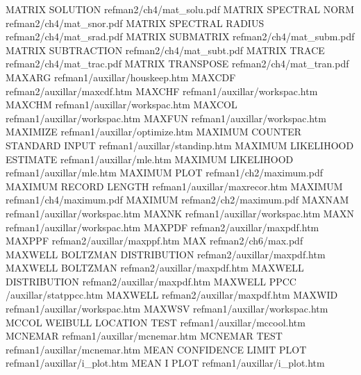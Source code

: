 MATRIX SOLUTION                         refman2/ch4/mat_solu.pdf
MATRIX SPECTRAL NORM                    refman2/ch4/mat_snor.pdf
MATRIX SPECTRAL RADIUS                  refman2/ch4/mat_srad.pdf
MATRIX SUBMATRIX                        refman2/ch4/mat_subm.pdf
MATRIX SUBTRACTION                      refman2/ch4/mat_subt.pdf
MATRIX TRACE                            refman2/ch4/mat_trac.pdf
MATRIX TRANSPOSE                        refman2/ch4/mat_tran.pdf
MAXARG                                  refman1/auxillar/houskeep.htm
MAXCDF                                  refman2/auxillar/maxcdf.htm
MAXCHF                                  refman1/auxillar/workspac.htm
MAXCHM                                  refman1/auxillar/workspac.htm
MAXCOL                                  refman1/auxillar/workspac.htm
MAXFUN                                  refman1/auxillar/workspac.htm
MAXIMIZE                                refman1/auxillar/optimize.htm
MAXIMUM COUNTER STANDARD INPUT          refman1/auxillar/standinp.htm
MAXIMUM LIKELIHOOD ESTIMATE             refman1/auxillar/mle.htm
MAXIMUM LIKELIHOOD                      refman1/auxillar/mle.htm
MAXIMUM PLOT                            refman1/ch2/maximum.pdf
MAXIMUM RECORD LENGTH                   refman1/auxillar/maxrecor.htm
MAXIMUM                                 refman1/ch4/maximum.pdf
MAXIMUM                                 refman2/ch2/maximum.pdf
MAXNAM                                  refman1/auxillar/workspac.htm
MAXNK                                   refman1/auxillar/workspac.htm
MAXN                                    refman1/auxillar/workspac.htm
MAXPDF                                  refman2/auxillar/maxpdf.htm
MAXPPF                                  refman2/auxillar/maxppf.htm
MAX                                     refman2/ch6/max.pdf
MAXWELL BOLTZMAN DISTRIBUTION           refman2/auxillar/maxpdf.htm
MAXWELL BOLTZMAN                        refman2/auxillar/maxpdf.htm
MAXWELL DISTRIBUTION                    refman2/auxillar/maxpdf.htm
MAXWELL PPCC                            /auxillar/statppcc.htm
MAXWELL                                 refman2/auxillar/maxpdf.htm
MAXWID                                  refman1/auxillar/workspac.htm
MAXWSV                                  refman1/auxillar/workspac.htm
MCCOL WEIBULL LOCATION TEST             refman1/auxillar/mccool.htm
MCNEMAR                                 refman1/auxillar/mcnemar.htm
MCNEMAR TEST                            refman1/auxillar/mcnemar.htm
MEAN CONFIDENCE LIMIT PLOT              refman1/auxillar/i_plot.htm
MEAN I PLOT                             refman1/auxillar/i_plot.htm
